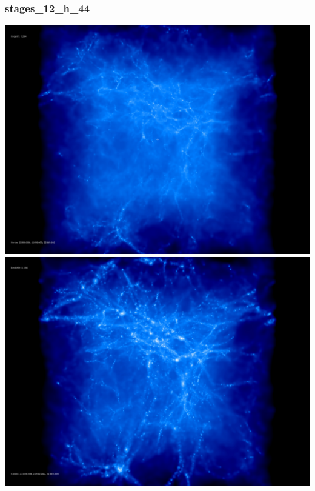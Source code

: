 % 
%
%
%
%
%
%
%

\newpage

\subsubsection{stages\_12\_h\_44}

\includegraphics[scale=0.1]{r256/h70/stages_12_h_44/50.jpg} 
\includegraphics[scale=0.1]{r256/h70/stages_12_h_44/150.jpg} \\
